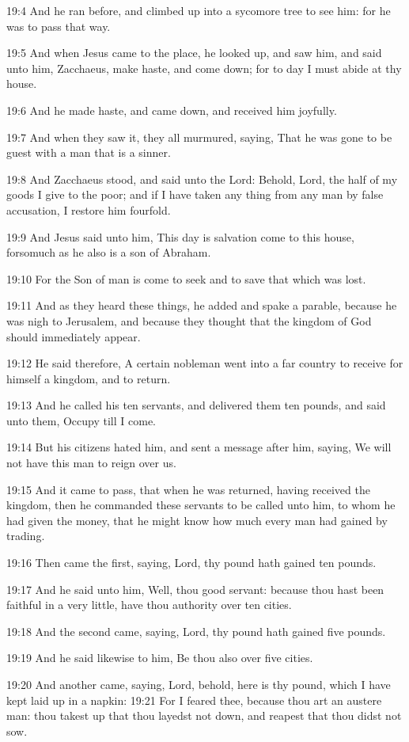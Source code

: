 19:4 And he ran before, and climbed up into a sycomore tree to see him: for he was to pass that way.

19:5 And when Jesus came to the place, he looked up, and saw him, and said unto him, Zacchaeus, make haste, and come down; for to day I must abide at thy house.

19:6 And he made haste, and came down, and received him joyfully.

19:7 And when they saw it, they all murmured, saying, That he was gone to be guest with a man that is a sinner.

19:8 And Zacchaeus stood, and said unto the Lord: Behold, Lord, the half of my goods I give to the poor; and if I have taken any thing from any man by false accusation, I restore him fourfold.

19:9 And Jesus said unto him, This day is salvation come to this house, forsomuch as he also is a son of Abraham.

19:10 For the Son of man is come to seek and to save that which was lost.

19:11 And as they heard these things, he added and spake a parable, because he was nigh to Jerusalem, and because they thought that the kingdom of God should immediately appear.

19:12 He said therefore, A certain nobleman went into a far country to receive for himself a kingdom, and to return.

19:13 And he called his ten servants, and delivered them ten pounds, and said unto them, Occupy till I come.

19:14 But his citizens hated him, and sent a message after him, saying, We will not have this man to reign over us.

19:15 And it came to pass, that when he was returned, having received the kingdom, then he commanded these servants to be called unto him, to whom he had given the money, that he might know how much every man had gained by trading.

19:16 Then came the first, saying, Lord, thy pound hath gained ten pounds.

19:17 And he said unto him, Well, thou good servant: because thou hast been faithful in a very little, have thou authority over ten cities.

19:18 And the second came, saying, Lord, thy pound hath gained five pounds.

19:19 And he said likewise to him, Be thou also over five cities.

19:20 And another came, saying, Lord, behold, here is thy pound, which I have kept laid up in a napkin: 19:21 For I feared thee, because thou art an austere man: thou takest up that thou layedst not down, and reapest that thou didst not sow.

